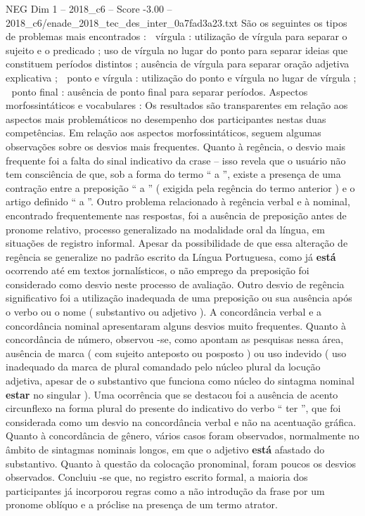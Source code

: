 \begin{textsample}{NEG Dim 1 – 2018\_c6 – Score -3.00 – 2018\_c6/enade\_2018\_tec\_des\_inter\_0a7fad3a23.txt}
São os seguintes os tipos de problemas mais encontrados :  vírgula : utilização de vírgula para separar o sujeito e o predicado ; uso de vírgula no lugar do ponto para separar ideias que constituem períodos distintos ; ausência de vírgula para separar oração adjetiva explicativa ;  ponto e vírgula : utilização do ponto e vírgula no lugar de vírgula ;  ponto final : ausência de ponto final para separar períodos.
Aspectos morfossintáticos e vocabulares : Os resultados são transparentes em relação aos aspectos mais problemáticos no desempenho dos participantes nestas duas competências.
Em relação aos aspectos morfossintáticos, seguem algumas observações sobre os desvios mais frequentes.
Quanto à regência, o desvio mais frequente foi a falta do sinal indicativo da crase – isso revela que o usuário não tem consciência de que, sob a forma do termo “ a ”, existe a presença de uma contração entre a preposição “ a ” ( exigida pela regência do termo anterior ) e o artigo definido “ a ”.
Outro problema relacionado à regência verbal e à nominal, encontrado frequentemente nas respostas, foi a ausência de preposição antes de pronome relativo, processo generalizado na modalidade oral da língua, em situações de registro informal.
Apesar da possibilidade de que essa alteração de regência se generalize no padrão escrito da Língua Portuguesa, como já \textbf{está} ocorrendo até em textos jornalísticos, o não emprego da preposição foi considerado como desvio neste processo de avaliação.
Outro desvio de regência significativo foi a utilização inadequada de uma preposição ou sua ausência após o verbo ou o nome ( substantivo ou adjetivo ).
A concordância verbal e a concordância nominal apresentaram alguns desvios muito frequentes.
Quanto à concordância de número, observou -se, como apontam as pesquisas nessa área, ausência de marca ( com sujeito anteposto ou posposto ) ou uso indevido ( uso inadequado da marca de plural comandado pelo núcleo plural da locução adjetiva, apesar de o substantivo que funciona como núcleo do sintagma nominal \textbf{estar} no singular ).
Uma ocorrência que se destacou foi a ausência de acento circunflexo na forma plural do presente do indicativo do verbo “ ter ”, que foi considerada como um desvio na concordância verbal e não na acentuação gráfica.
Quanto à concordância de gênero, vários casos foram observados, normalmente no âmbito de sintagmas nominais longos, em que o adjetivo \textbf{está} afastado do substantivo.
Quanto à questão da colocação pronominal, foram poucos os desvios observados.
Concluiu -se que, no registro escrito formal, a maioria dos participantes já incorporou regras como a não introdução da frase por um pronome oblíquo e a próclise na presença de um termo atrator.

\end{textsample}
